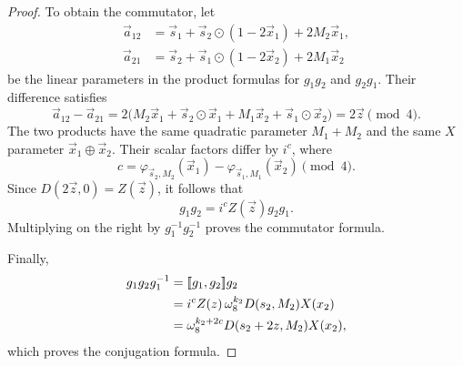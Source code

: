 \begin{proof}
To obtain the commutator, let
\begin{align*}
    \vec{a}_{12}
    &=
    \vec{s}_1+\vec{s}_2\odot(1-2\vec{x}_1)
    +2M_2\vec{x}_1,
    \\
    \vec{a}_{21}
    &=
    \vec{s}_2+\vec{s}_1\odot(1-2\vec{x}_2)
    +2M_1\vec{x}_2
\end{align*}
be the linear parameters in the product formulas for
$g_1g_2$ and $g_2g_1$. Their difference satisfies
\[
    \vec{a}_{12}-\vec{a}_{21}
    =
    2\big(
        M_2\vec{x}_1+\vec{s}_2\odot\vec{x}_1
        +M_1\vec{x}_2+\vec{s}_1\odot\vec{x}_2
    \big)
    =
    2\vec{z}
    \pmod 4.
\]
The two products have the same quadratic parameter
$M_1+M_2$ and the same $X$ parameter
$\vec{x}_1\oplus\vec{x}_2$. Their scalar factors differ
by $i^c$, where
\[
    c=
    \varphi_{\vec{s}_2,M_2}(\vec{x}_1)
    -
    \varphi_{\vec{s}_1,M_1}(\vec{x}_2)
    \pmod 4.
\]
Since $D(2\vec{z},0)=Z(\vec{z})$, it follows that
\[
    g_1g_2=i^c Z(\vec{z})g_2g_1.
\]
Multiplying on the right by $g_1^{-1}g_2^{-1}$ proves
the commutator formula.

Finally,
\begin{align*}
    g_1g_2g_1^{-1}
    &=\mathopen{[\![}g_1,g_2\mathclose{]\!]}g_2\\
    &=i^c Z(z)\,
      \omega_8^{k_2}D(s_2,M_2)X(x_2)\\
    &=\omega_8^{k_2+2c}
      D(s_2+2z,M_2)X(x_2),
\end{align*}
which proves the conjugation formula.
\end{proof}


